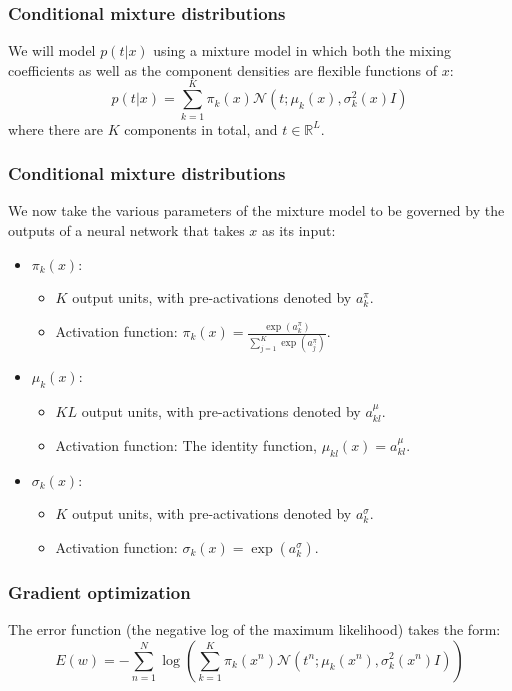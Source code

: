 \documentclass{beamer}
\begin{document}
\begin{frame}
    \frametitle{Conditional mixture distributions}
    We will model $p(t|x)$ using a mixture model in which both the mixing coefficients as well as the component densities are flexible functions of $x$:
    \begin{equation*}
        p(t|x)=\sum_{k=1}^{K}\pi_{k}(x)\mathcal{N}(t;\mu_{k}(x),\sigma^{2}_{k}(x)I)
    \end{equation*}
    where there are $K$ components in total, and $t\in\mathbb{R}^{L}$.
\end{frame}

\begin{frame}
    \frametitle{Conditional mixture distributions}
    We now take the various parameters of the mixture model to be governed by the outputs of a neural network that takes $x$ as its input:
    \begin{itemize}
        \item $\pi_{k}(x)$:
        \begin{itemize}
            \item $K$ output units, with pre-activations denoted by $a^{\pi}_{k}$.
            \item Activation function: $\pi_{k}(x)=\frac{\exp(a^{\pi}_{k})}{\sum_{j=1}^{K}\exp(a^{\pi}_{j})}$.
        \end{itemize}
        \item $\mu_{k}(x)$:
        \begin{itemize}
            \item $KL$ output units, with pre-activations denoted by $a^{\mu}_{kl}$.
            \item Activation function: The identity function, $\mu_{kl}(x)=a^{\mu}_{kl}$.
        \end{itemize}
        \item $\sigma_{k}(x)$:
        \begin{itemize}
            \item $K$ output units, with pre-activations denoted by $a^{\sigma}_{k}$.
            \item Activation function: $\sigma_{k}(x)=\exp(a^{\sigma}_{k})$.
        \end{itemize}
    \end{itemize}
\end{frame}

\begin{frame}
    \frametitle{Gradient optimization}
    The error function (the negative log of the maximum likelihood) takes the form:
    \begin{equation*}
        E(w)=-\sum_{n=1}^{N}\log(\sum_{k=1}^{K}\pi_{k}(x^{n})\mathcal{N}(t^{n};\mu_{k}(x^{n}),\sigma^{2}_{k}(x^{n})I))
    \end{equation*}
\end{frame}
\end{document}
